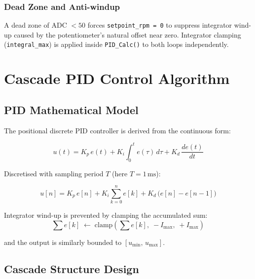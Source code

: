 \documentclass[12pt, a4paper]{report}
\begin{document}
\subsection{Dead Zone and Anti-windup}

A dead zone of ADC $< 50$ forces \texttt{setpoint\_rpm = 0} to suppress
integrator wind-up caused by the potentiometer's natural offset near
zero. Integrator clamping (\texttt{integral\_max}) is applied inside
\texttt{PID\_Calc()} to both loops independently.

\chapter{Cascade PID Control Algorithm}

\section{PID Mathematical Model}

The positional discrete PID controller is derived from the continuous form:

\begin{equation}
    u(t) = K_p\,e(t) + K_i\int_0^t e(\tau)\,d\tau + K_d\,\frac{de(t)}{dt}
\end{equation}

Discretised with sampling period $T$ (here $T = 1\,\text{ms}$):

\begin{equation}
    u[n] = K_p\,e[n]
         + K_i \sum_{k=0}^{n} e[k]
         + K_d\,\bigl(e[n] - e[n-1]\bigr)
    \label{eq:pid_discrete}
\end{equation}

Integrator wind-up is prevented by clamping the accumulated sum:
\begin{equation}
    \sum e[k] \;\leftarrow\; \text{clamp}\!\left(\sum e[k],\;
    -I_{\max},\; +I_{\max}\right)
\end{equation}

and the output is similarly bounded to $[u_{\min},\, u_{\max}]$.

\section{Cascade Structure Design}
\end{document}
